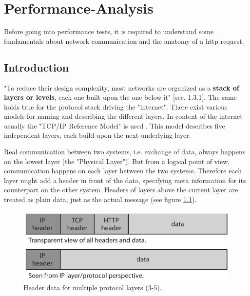 \chapter{Performance-Analysis}

Before going into performance tests, it is required to understand some fundamentals about network communication and the anatomy of a \gls{http} request.

\section{Introduction}

"To reduce their design complexity, most networks are organized as a \textbf{stack of layers or levels}, each one built upon the one below it" \cite{kn1}[sec. 1.3.1]. The same holds true for the protocol stack driving the "internet". There exist various models for naming and describing the different layers. In context of the internet usually the "TCP/IP Reference Model" is used \cite{kn1}. This model describes five independent layers, each build upon the next underlying layer. 

Real communication between two systems, i.e. exchange of data, always happens on the lowest layer (the "Physical Layer"). But from a logical point of view, communication happens on each layer between the two systems. Therefore each layer might add a header in front of the data, specifying meta information for its counterpart on the other system. Headers of layers above the current layer are treated as plain data, just as the actual message (see figure \ref{fig:header-layers}).

\begin{figure}[H]
	\centering
	\includegraphics[scale=1]{images/protocol-headers.pdf}
	\caption{Header data for multiple protocol layers (3-5).}
	\label{fig:header-layers}
\end{figure}

